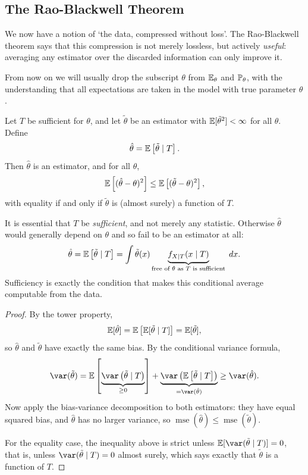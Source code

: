 \documentclass[a4paper]{scrartcl}
\newcommand{\mse}{\operatorname{mse}}
\begin{document}
\subsection{The Rao-Blackwell Theorem}

We now have a notion of `the data, compressed without loss'. The Rao-Blackwell theorem says that this compression is not merely lossless, but actively \emph{useful}: averaging any estimator over the discarded information can only improve it.

From now on we will usually drop the subscript $\theta$ from $\mathbb{E}_\theta$ and $\mathbb{P}_\theta$, with the understanding that all expectations are taken in the model with true parameter $\theta$.

\begin{theorem}
  Let $T$ be sufficient for $\theta$, and let $\tilde\theta$ be an estimator with $\mathbb{E}[\tilde\theta^2] < \infty$ for all $\theta$. Define
  $$
  \hat\theta = \mathbb{E}\left[\tilde\theta \mid T\right].
  $$
  Then $\hat\theta$ is an estimator, and for all $\theta$,
  $$
  \mathbb{E}\left[(\hat\theta - \theta)^2\right] \leq \mathbb{E}\left[(\tilde\theta - \theta)^2\right],
  $$
  with equality if and only if $\tilde\theta$ is (almost surely) a function of $T$.
\end{theorem}

\begin{remark}
  It is essential that $T$ be \emph{sufficient}, and not merely any statistic. Otherwise $\hat\theta$ would generally depend on $\theta$ and so fail to be an estimator at all:
  $$
  \hat\theta = \mathbb{E}\left[\tilde\theta \mid T\right] = \int \tilde\theta(x) \underbrace{f_{X\mid T}(x \mid T)}_{\text{free of }\theta \text{ as } T \text{ is sufficient}}\; d x.
  $$
  Sufficiency is exactly the condition that makes this conditional average computable from the data.
\end{remark}

\begin{proof}
  By the tower property,
  $$
  \mathbb{E}[\hat\theta] = \mathbb{E}\left[\mathbb{E}[\tilde\theta \mid T]\right] = \mathbb{E}[\tilde\theta],
  $$
  so $\hat\theta$ and $\tilde\theta$ have exactly the same bias. By the conditional variance formula,
  $$
  \var(\tilde\theta) = \EE\left[\underbrace{\var\left(\tilde\theta \mid T\right)}_{\geq 0}\right] + \underbrace{\var\left(\EE\left[\tilde\theta\mid T\right]\right)}_{= \var(\hat\theta)} \geq \var(\hat\theta).
  $$
  Now apply the bias-variance decomposition to both estimators: they have equal squared bias, and $\hat\theta$ has no larger variance, so $\mse(\hat\theta) \leq \mse(\tilde\theta)$.

  For the equality case, the inequality above is strict unless $\EE[\var(\tilde\theta \mid T)] = 0$, that is, unless $\var(\tilde\theta \mid T) = 0$ almost surely, which says exactly that $\tilde\theta$ is a function of $T$.
\end{proof}
\end{document}
